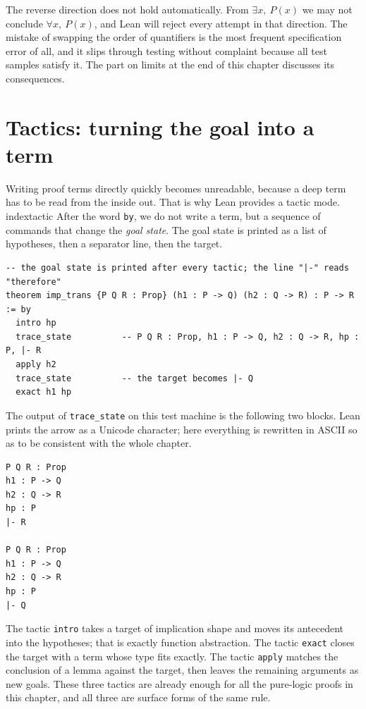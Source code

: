 \begin{catatan}
The reverse direction does not hold automatically. From $\exists x,\ P(x)$ we may not conclude
$\forall x,\ P(x)$, and Lean will reject every attempt in that direction. The mistake of swapping
the order of quantifiers is the most frequent specification error of all, and it slips through
testing without complaint because all test samples satisfy it. The part on limits at the end of this
chapter discusses its consequences.
\end{catatan}

\section{Tactics: turning the goal into a term}


Writing proof terms directly quickly becomes unreadable, because a deep term has to be read from the
inside out. That is why Lean provides a tactic mode.\\index{tactic} After the word \texttt{by}, we
do not write a term, but a sequence of commands that change the \emph{goal state}. The goal state is
printed as a list of hypotheses, then a separator line, then the target.


\begin{verbatim}
-- the goal state is printed after every tactic; the line "|-" reads "therefore"
theorem imp_trans {P Q R : Prop} (h1 : P -> Q) (h2 : Q -> R) : P -> R := by
  intro hp
  trace_state          -- P Q R : Prop, h1 : P -> Q, h2 : Q -> R, hp : P, |- R
  apply h2
  trace_state          -- the target becomes |- Q
  exact h1 hp
\end{verbatim}

The output of \texttt{trace\_state} on this test machine is the following two blocks. Lean prints
the arrow as a Unicode character; here everything is rewritten in ASCII so as to be consistent with
the whole chapter.

\begin{verbatim}
P Q R : Prop
h1 : P -> Q
h2 : Q -> R
hp : P
|- R

P Q R : Prop
h1 : P -> Q
h2 : Q -> R
hp : P
|- Q
\end{verbatim}

The tactic \texttt{intro} takes a target of implication shape and moves its antecedent into the
hypotheses; that is exactly function abstraction. The tactic \texttt{exact} closes the target with a
term whose type fits exactly. The tactic \texttt{apply} matches the conclusion of a lemma against
the target, then leaves the remaining arguments as new goals. These three tactics are already enough
for all the pure-logic proofs in this chapter, and all three are surface forms of the same rule.

